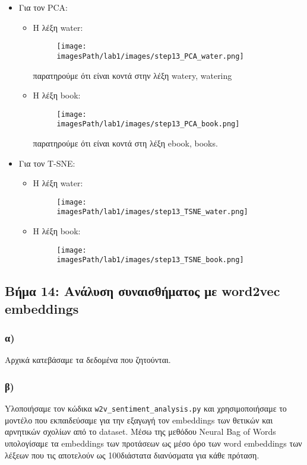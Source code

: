 \documentclass[a4paper, 12pt]{article}
\newcommand{\imagesPath}{.}
\begin{document}
        	\begin{itemize}
        		\item Για τον PCA:
        			\begin{itemize}
        				\item H λέξη water:
					        \begin{figure}[H]
								        	\texttt{[image: \\imagesPath/lab1/images/step13\_PCA\_water.png]}
					        \end{figure}
					       παρατηρούμε ότι είναι κοντά στην λέξη watery, watering
						\item        Η λέξη book:
					       \begin{figure}[H]
      					       	\texttt{[image: \\imagesPath/lab1/images/step13\_PCA\_book.png]}
					       \end{figure}
					       
					       παρατηρούμε ότι είναι κοντά στη λέξη ebook, books.
        			\end{itemize}
        		\item Για τον T-SNE:
        			\begin{itemize}
        				\item H λέξη water:
			    		        \begin{figure}[H]
			    				    \texttt{[image: \\imagesPath/lab1/images/step13\_TSNE\_water.png]}
			    		        \end{figure}
        				 \item Η λέξη book:
					           \begin{figure}[H]
					           		\texttt{[image: \\imagesPath/lab1/images/step13\_TSNE\_book.png]}
					           \end{figure}
        			\end{itemize}			
        	\end{itemize}

    \subsection*{Βήμα 14: Ανάλυση συναισθήματος με word2vec embeddings}
        \subsubsection*{α)}
        	Αρχικά κατεβάσαμε τα δεδομένα που ζητούνται.
        \subsubsection*{β)}
        	Yλοποιήσαμε τον κώδικα \verb|w2v_sentiment_analysis.py| και χρησιμοποιήσαμε το μοντέλο που εκπαιδεύσαμε για την εξαγωγή τον embeddings των θετικών και αρνητικών σχολίων από το dataset. Mέσω της μεθόδου Neural Bag of Words  υπολογίσαμε τα embeddings των προτάσεων ως μέσο όρο των word embeddings των λέξεων που τις αποτελούν ως 100διάστατα διανύσματα για κάθε πρόταση.
\end{document}
